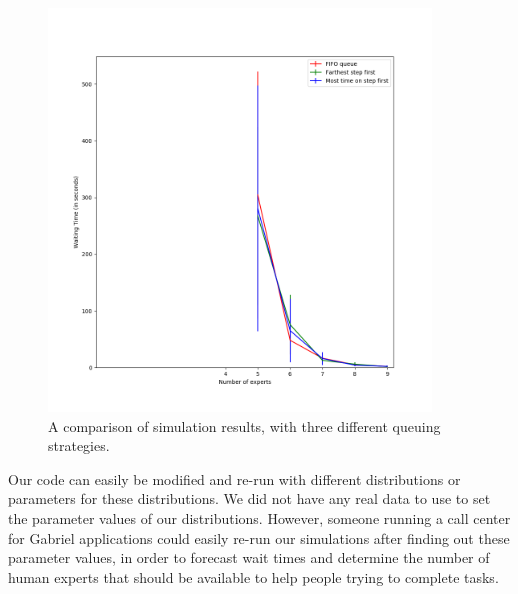 \begin{figure}[h]
  \includegraphics[width=4in]{figures/montecarlo/full_three_strategies.png}
  \caption{
    A comparison of simulation results, with three different queuing strategies.
  }\label{fig:full_three_strategies}
\end{figure}

Our code can easily be modified and re-run with different distributions or
parameters for these distributions.
We did not have any real data to use to set the parameter values of our
distributions.
However, someone running a call center for Gabriel applications could easily
re-run our simulations after finding out these parameter values, in order to
forecast wait times and determine the number of human experts that should be
available to help people trying to complete tasks.
